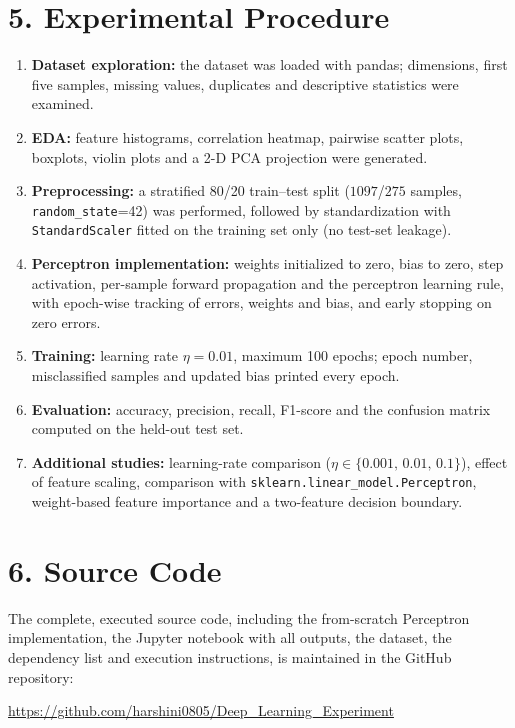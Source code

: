 \documentclass[11pt]{article}
\begin{document}
\section*{5. Experimental Procedure}
\begin{enumerate}[leftmargin=*]
\item \textbf{Dataset exploration:} the dataset was loaded with pandas; dimensions, first five samples, missing values, duplicates and descriptive statistics were examined.
\item \textbf{EDA:} feature histograms, correlation heatmap, pairwise scatter plots, boxplots, violin plots and a 2-D PCA projection were generated.
\item \textbf{Preprocessing:} a stratified 80/20 train--test split ($1097$/$275$ samples, \texttt{random\_state}=42) was performed, followed by standardization with \texttt{StandardScaler} fitted on the training set only (no test-set leakage).
\item \textbf{Perceptron implementation:} weights initialized to zero, bias to zero, step activation, per-sample forward propagation and the perceptron learning rule, with epoch-wise tracking of errors, weights and bias, and early stopping on zero errors.
\item \textbf{Training:} learning rate $\eta=0.01$, maximum 100 epochs; epoch number, misclassified samples and updated bias printed every epoch.
\item \textbf{Evaluation:} accuracy, precision, recall, F1-score and the confusion matrix computed on the held-out test set.
\item \textbf{Additional studies:} learning-rate comparison ($\eta\in\{0.001,\,0.01,\,0.1\}$), effect of feature scaling, comparison with \texttt{sklearn.linear\_model.Perceptron}, weight-based feature importance and a two-feature decision boundary.
\end{enumerate}
\section*{6. Source Code}
The complete, executed source code, including the from-scratch Perceptron implementation, the Jupyter notebook with all outputs, the dataset, the dependency list and execution instructions, is maintained in the GitHub repository:
\begin{center}
\url{https://github.com/harshini0805/Deep_Learning_Experiment}
\end{center}
\end{document}
